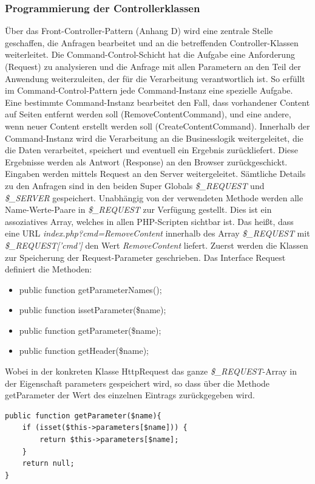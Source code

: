 \documentclass[10.5pt]{scrarticle}
\begin{document}
\subsubsection{Programmierung der Controllerklassen}

Über das Front-Controller-Pattern (Anhang D) wird eine zentrale Stelle geschaffen, die Anfragen bearbeitet und an die betreffenden Controller-Klassen weiterleitet.  
Die Command-Control-Schicht hat die Aufgabe eine Anforderung (Request) zu analysieren und die Anfrage mit allen Parametern an den Teil der Anwendung weiterzuleiten, der für die Verarbeitung verantwortlich ist. So erfüllt im Command-Control-Pattern jede Command-Instanz eine spezielle Aufgabe. Eine bestimmte Command-Instanz bearbeitet den Fall, dass vorhandener Content auf Seiten entfernt werden soll (RemoveContentCommand), und eine andere, wenn neuer Content erstellt werden soll (CreateContentCommand).  
Innerhalb der Command-Instanz wird die Verarbeitung an die Businesslogik weitergeleitet, die die Daten verarbeitet, speichert und eventuell ein Ergebnis zurückliefert. Diese Ergebnisse werden als Antwort (Response) an den Browser zurückgeschickt.  
Eingaben werden mittels Request an den Server weitergeleitet. Sämtliche Details zu den Anfragen sind in den beiden Super Globals \textit{\$\_REQUEST} und \textit{\$\_SERVER} gespeichert. Unabhängig von der verwendeten Methode werden alle Name-Werte-Paare in \textit{\$\_REQUEST} zur Verfügung gestellt. Dies ist ein assoziatives Array, welches in allen PHP-Scripten sichtbar ist. Das hei{\ss}t, dass eine URL \textit{index.php?cmd=RemoveContent} innerhalb des Array \textit{\$\_REQUEST} mit \textit{\$\_REQUEST['cmd']} den Wert \textit{RemoveContent} liefert. 
Zuerst werden die Klassen zur Speicherung der Request-Parameter geschrieben.  
Das Interface Request definiert die Methoden:
\begin{itemize}
    \item public function getParameterNames();
	\item public function issetParameter(\$name);
	\item public function getParameter(\$name);
	\item public function getHeader(\$name);
\end{itemize}
Wobei in der konkreten Klasse HttpRequest das ganze \textit{\$\_REQUEST}-Array in der Eigenschaft parameters gespeichert wird, so dass über die Methode getParameter der Wert des einzelnen Eintrags zurückgegeben wird.

\lstset{firstnumber=1}
\begin{lstlisting}
public function getParameter($name){
    if (isset($this->parameters[$name])) {
        return $this->parameters[$name];
    }
    return null;
} 
\end{lstlisting}
\end{document}

